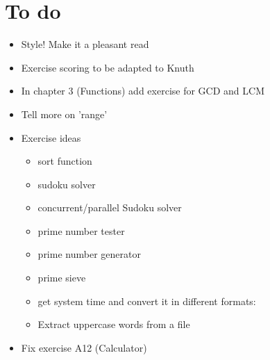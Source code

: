 \section{To do}

\begin{itemize}
\item
Style! Make it a pleasant read
\item
Exercise scoring to be adapted to Knuth
\item
In chapter 3 (Functions) add exercise for GCD and LCM
\item
Tell more on 'range'
\item
Exercise ideas
\begin{itemize}
\item
sort function
\item
sudoku solver
\item
concurrent/parallel Sudoku solver
\item
prime number tester
\item
prime number generator
\item
prime sieve
\item
get system time and convert it in different formats:
\item
Extract uppercase words from a file
\end{itemize}
\item
Fix exercise A12 (Calculator)
\end{itemize}
